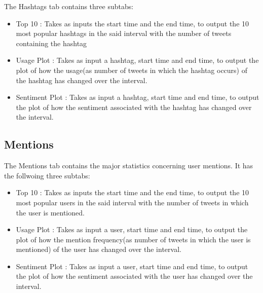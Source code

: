 \documentclass[letterpaper,10pt,english]{sphinxmanual}
\begin{document}
The Hashtags tab contains three subtabs:
\begin{itemize}
\item {} 
Top 10 : Takes as inputs the start time and the end time, to output the 10 most popular hashtags in the said interval with the number of tweets containing the hashtag

\item {} 
Usage Plot : Takes as input a hashtag, start time and end time, to output the plot of how the usage(as number of tweets in which the hashtag occurs) of the hashtag has changed over the interval.

\item {} 
Sentiment Plot : Takes as input a hashtag, start time and end time, to output the plot of how the sentiment associated with the hashtag has changed over the interval.

\end{itemize}


\subsection{Mentions}
\label{\detokenize{dashboard_website:mentions}}
The Mentions tab contains the major statistics concerning user mentions. It has the follwoing three subtabs:
\begin{itemize}
\item {} 
Top 10 : Takes as inputs the start time and the end time, to output the 10 most popular users in the said interval with the number of tweets in which the user is mentioned.

\item {} 
Usage Plot : Takes as input a user, start time and end time, to output the plot of how the mention frequency(as number of tweets in which the user is mentioned) of the user has changed over the interval.

\item {} 
Sentiment Plot : Takes as input a user, start time and end time, to output the plot of how the sentiment associated with the user has changed over the interval.

\end{itemize}
\end{document}

